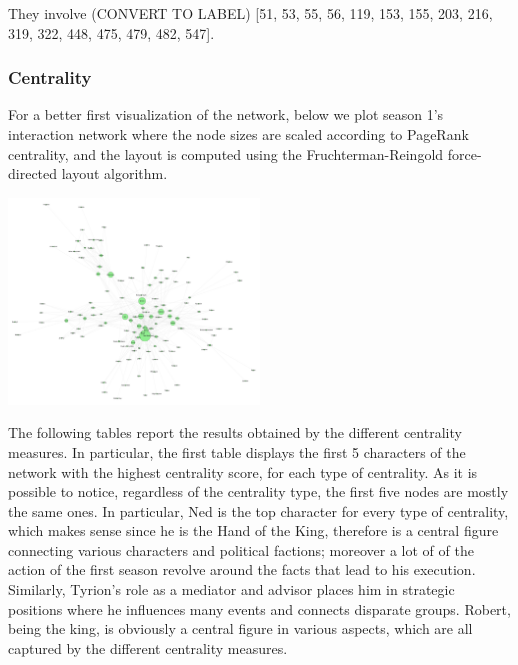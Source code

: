 \documentclass[10pt,twocolumn,letterpaper]{article}
\begin{document}
They involve (CONVERT TO LABEL) [51, 53, 55, 56, 119, 153, 155, 203, 216, 319, 322, 448, 475, 479, 482, 547].

\subsubsection{Centrality}

For a better first visualization of the network, below we plot season 1's interaction network where the node sizes are scaled according to PageRank centrality, and the layout is computed using the Fruchterman-Reingold force-directed layout algorithm.

\begin{center}
    \includegraphics[width=0.5\textwidth]{img/s1/pagerank_network.jpg}
\end{center}


The following tables report the results obtained by the different centrality measures. In particular, the first table displays the first 5 characters of the network with the highest centrality score, for each type of centrality. As it is possible to notice, regardless of the centrality type, the first five nodes are mostly the same ones. In particular, Ned is the top character for every type of centrality, which makes sense since he is the Hand of the King, therefore is a central figure connecting various characters and political factions; moreover a lot of of the action of the first season revolve around the facts that lead to his execution. Similarly, Tyrion's role as a mediator and advisor places him in strategic positions where he influences many events and connects disparate groups. Robert, being the king, is obviously a central figure in various aspects, which are all captured by the different centrality measures. 
\end{document}
